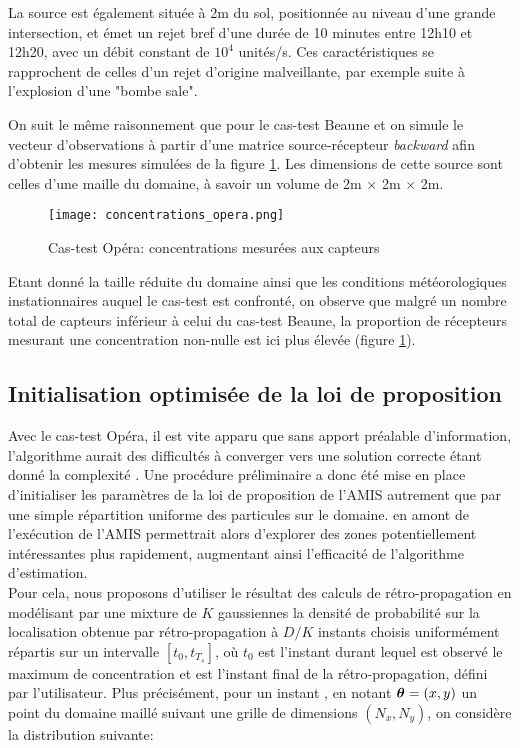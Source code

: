 La source est également située à 2m du sol, positionnée au niveau d'une grande intersection, et émet un rejet bref d'une durée de 10 minutes entre 12h10 et 12h20, avec un débit constant de $10^4$ unités/s. Ces caractéristiques se rapprochent de celles d'un rejet d'origine malveillante, par exemple suite à l'explosion d'une "bombe sale". 

On suit le même raisonnement que pour le cas-test Beaune et on simule le vecteur d'observations à partir d'une matrice source-récepteur \textit{backward} afin d'obtenir les mesures simulées de la figure \ref{fig_opera_obs}. Les dimensions de cette source sont celles d'une maille du domaine, à savoir un volume de 2m $\times$ 2m $\times$ 2m.

\begin{figure}[h!]
	\centering
	\texttt{[image: concentrations\_opera.png]}
	\caption{Cas-test Opéra: concentrations mesurées aux capteurs}
	\label{fig_opera_obs}
\end{figure}

Etant donné la taille réduite du domaine ainsi que les conditions météorologiques instationnaires auquel le cas-test est confronté, on observe que malgré un nombre total de capteurs inférieur à celui du cas-test Beaune, la proportion de récepteurs mesurant une concentration non-nulle est ici plus élevée (figure \ref{fig_opera_obs}).


\subsection{Initialisation optimisée de la loi de proposition}

Avec le cas-test Opéra, il est vite apparu que sans apport préalable d'information, l'algorithme aurait des difficultés à converger vers une solution correcte étant donné la complexité . Une procédure préliminaire a donc été mise en place  d'initialiser les paramètres de la loi de proposition de l'AMIS autrement que par une simple répartition uniforme des particules sur le domaine.  en amont de l'exécution de l'AMIS permettrait alors d'explorer des zones potentiellement intéressantes plus rapidement, augmentant ainsi l'efficacité de l'algorithme d'estimation. \\

Pour cela, nous proposons d'utiliser le résultat des calculs de rétro-propagation en modélisant par une mixture de $K$ gaussiennes la densité de probabilité sur la localisation obtenue par rétro-propagation à $D/K$ instants choisis uniformément répartis sur un intervalle $[t_0, t_{T_s}]$, où $t_0$ est l'instant durant lequel est observé le maximum de concentration et est l'instant final de la rétro-propagation, défini par l'utilisateur. Plus précisément, pour un instant , en notant ${\bm{\theta}} = (x,y)$ un point du domaine maillé suivant une grille de dimensions $(N_x,N_y)$, on considère la distribution suivante:


